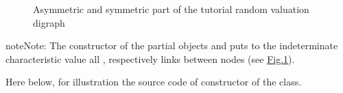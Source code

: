 \documentclass[a4paper,12pt,english]{sphinxhowto}
\let\sphinxpxdimen\pdfpxdimen\else\newdimen\sphinxpxdimen
\begin{document}
\begin{sphinxVerbatim}[commandchars=\\\{\},numbers=left,firstnumber=1,stepnumber=1]
   
                     
  
  
\end{sphinxVerbatim}

\begin{figure}[H]
\centering
\capstart

\noindent\sphinxincludegraphics[width=600\sphinxpxdimen]{{asymSymParts}.png}
\caption{Asymmetric and symmetric part of the tutorial random valuation digraph}\label{\detokenize{tutorial:asymsymparts}}\end{figure}

\begin{sphinxadmonition}{note}{Note:}
The constructor of the partial objects  and  puts to the indeterminate characteristic value all , respectively  links between nodes (see \hyperref[\detokenize{tutorial:asymsymparts}]{Fig.\@ \ref{\detokenize{tutorial:asymsymparts}}}).
\end{sphinxadmonition}

Here below, for illustration the source code of  constructor of the  class.
\end{document}
